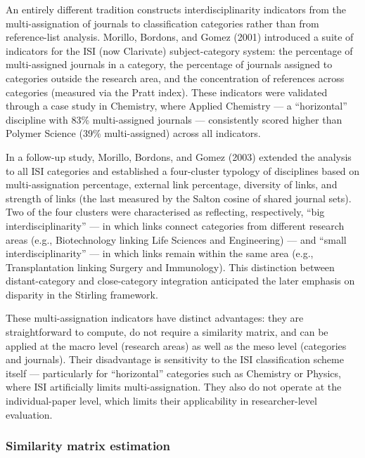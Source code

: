 \documentclass[
]{article}
\begin{document}
An entirely different tradition constructs interdisciplinarity
indicators from the multi-assignation of journals to classification
categories rather than from reference-list analysis. Morillo, Bordons,
and Gomez (2001) introduced a suite of indicators for the ISI (now
Clarivate) subject-category system: the percentage of multi-assigned
journals in a category, the percentage of journals assigned to
categories outside the research area, and the concentration of
references across categories (measured via the Pratt index). These
indicators were validated through a case study in Chemistry, where
Applied Chemistry --- a ``horizontal'' discipline with 83\%
multi-assigned journals --- consistently scored higher than Polymer
Science (39\% multi-assigned) across all indicators.

In a follow-up study, Morillo, Bordons, and Gomez (2003) extended the
analysis to all ISI categories and established a four-cluster typology
of disciplines based on multi-assignation percentage, external link
percentage, diversity of links, and strength of links (the last measured
by the Salton cosine of shared journal sets). Two of the four clusters
were characterised as reflecting, respectively, ``big
interdisciplinarity'' --- in which links connect categories from
different research areas (e.g., Biotechnology linking Life Sciences and
Engineering) --- and ``small interdisciplinarity'' --- in which links
remain within the same area (e.g., Transplantation linking Surgery and
Immunology). This distinction between distant-category and
close-category integration anticipated the later emphasis on disparity
in the Stirling framework.

These multi-assignation indicators have distinct advantages: they are
straightforward to compute, do not require a similarity matrix, and can
be applied at the macro level (research areas) as well as the meso level
(categories and journals). Their disadvantage is sensitivity to the ISI
classification scheme itself --- particularly for ``horizontal''
categories such as Chemistry or Physics, where ISI artificially limits
multi-assignation. They also do not operate at the individual-paper
level, which limits their applicability in researcher-level evaluation.

\hypertarget{similarity-matrix-estimation}{%
\subsubsection{Similarity matrix
estimation}\label{similarity-matrix-estimation}}
\end{document}
